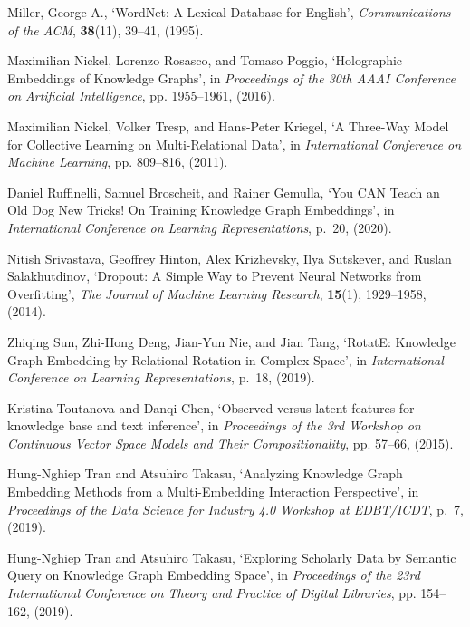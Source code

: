 \documentclass{ecai}
\theoremstyle{plain}  \newtheorem{thm}{Theorem}  \newtheorem{lem}[thm]{Lemma}  \newtheorem{prop}[thm]{Proposition}
\theoremstyle{remark}  \newtheorem*{rem}{Remark}
\begin{document}
\begin{thebibliography}{10}
{Miller, George A.}, `{{WordNet}}: A {{Lexical Database}} for {{English}}',
  {\em Communications of the ACM}, {\bf 38}(11),  39--41, (1995).

Maximilian Nickel, Lorenzo Rosasco, and Tomaso Poggio, `Holographic
  {{Embeddings}} of {{Knowledge Graphs}}', in {\em Proceedings of the 30th
  {{AAAI Conference}} on {{Artificial Intelligence}}}, pp. 1955--1961, (2016).

Maximilian Nickel, Volker Tresp, and Hans-Peter Kriegel, `A {{Three-Way Model}}
  for {{Collective Learning}} on {{Multi-Relational Data}}', in {\em
  International {{Conference}} on {{Machine Learning}}}, pp. 809--816, (2011).

Daniel Ruffinelli, Samuel Broscheit, and Rainer Gemulla, `You {{CAN Teach}} an
  {{Old Dog New Tricks}}! {{On Training Knowledge Graph Embeddings}}', in {\em
  International {{Conference}} on {{Learning Representations}}}, p.~20, (2020).

Nitish Srivastava, Geoffrey Hinton, Alex Krizhevsky, Ilya Sutskever, and Ruslan
  Salakhutdinov, `Dropout: {{A Simple Way}} to {{Prevent Neural Networks}} from
  {{Overfitting}}', {\em The Journal of Machine Learning Research}, {\bf
  15}(1),  1929--1958, (2014).

Zhiqing Sun, Zhi-Hong Deng, Jian-Yun Nie, and Jian Tang, `{{RotatE}}:
  {{Knowledge Graph Embedding}} by {{Relational Rotation}} in {{Complex
  Space}}', in {\em International {{Conference}} on {{Learning
  Representations}}}, p.~18, (2019).

Kristina Toutanova and Danqi Chen, `Observed versus latent features for
  knowledge base and text inference', in {\em Proceedings of the 3rd
  {{Workshop}} on {{Continuous Vector Space Models}} and Their
  {{Compositionality}}}, pp. 57--66, (2015).

Hung-Nghiep Tran and Atsuhiro Takasu, `Analyzing {{Knowledge Graph Embedding
  Methods}} from a {{Multi-Embedding Interaction Perspective}}', in {\em
  Proceedings of the {{Data Science}} for {{Industry}} 4.0 {{Workshop}} at
  {{EDBT}}/{{ICDT}}}, p.~7, (2019).

Hung-Nghiep Tran and Atsuhiro Takasu, `Exploring {{Scholarly Data}} by
  {{Semantic Query}} on {{Knowledge Graph Embedding Space}}', in {\em
  Proceedings of the 23rd {{International Conference}} on {{Theory}} and
  {{Practice}} of {{Digital Libraries}}}, pp. 154--162, (2019).


\end{thebibliography}
\end{document}
